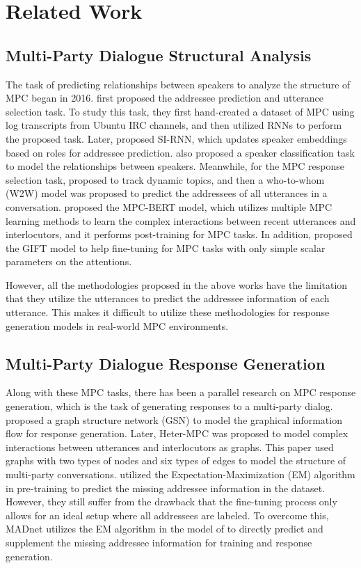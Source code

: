 \section{Related Work}
\subsection{Multi-Party Dialogue Structural Analysis}
The task of predicting relationships between speakers to analyze the structure of MPC began in 2016. \citet{ouchi-tsuboi-2016-addressee} first proposed the addressee prediction and utterance selection task. To study this task, they first hand-created a dataset of MPC using log transcripts from Ubuntu IRC channels, and then utilized RNNs to perform the proposed task. Later, \citet{Zhang2018Addressee} proposed SI-RNN, which updates speaker embeddings based on roles for addressee prediction. \citet{Meng2017TowardsNS} also proposed a speaker classification task to model the relationships between speakers. Meanwhile, for the MPC response selection task, \citet{wang-etal-2020-response} proposed to track dynamic topics, and then a who-to-whom (W2W) model \cite{le-etal-2019-speaking} was proposed to predict the addressees of all utterances in a conversation. \citet{Gu2021MPCBERTAP} proposed the MPC-BERT model, which utilizes multiple MPC learning methods to learn the complex interactions between recent utterances and interlocutors, and it performs post-training for MPC tasks. In addition, \citet{Gu2023GIFTGF} proposed the GIFT model to help fine-tuning for MPC tasks with only simple scalar parameters on the attentions.

However, all the methodologies proposed in the above works have the limitation that they utilize the utterances to predict the addressee information of each utterance. This makes it difficult to utilize these methodologies for response generation models in real-world MPC environments.

\subsection{Multi-Party Dialogue Response Generation}
Along with these MPC tasks, there has been a parallel research on MPC response generation, which is the task of generating responses to a multi-party dialog. \citet{Hu2019GSNAG} proposed a graph structure network (GSN) to model the graphical information flow for response generation. Later, Heter-MPC \cite{gu-etal-2022-hetermpc} was proposed to model complex interactions between utterances and interlocutors as graphs. This paper used graphs with two types of nodes and six types of edges to model the structure of multi-party conversations. \citet{li-zhao-2023-em} utilized the Expectation-Maximization (EM) algorithm in pre-training to predict the missing addressee information in the dataset. However, they still suffer from the drawback that the fine-tuning process only allows for an ideal setup where all addressees are labeled. To overcome this, MADnet \cite{gu-etal-2023-madnet} utilizes the EM algorithm in the model of \citet{gu-etal-2022-hetermpc} to directly predict and supplement the missing addressee information for training and response generation.

